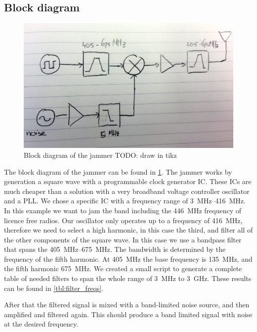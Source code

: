 \documentclass[a4paper, openany, oneside]{memoir}
\begin{document}
\subsection{Block diagram}
\begin{figure}[h]
    \centering
    \includegraphics[width=\textwidth]{block_diagram.jpg}
    \caption{Block diagram of the jammer TODO: draw in tikz}
    \label{fig:block_diagram_jammer}
\end{figure}

The block diagram of the jammer can be found in \cref{fig:block_diagram_jammer}. The jammer works by generation a square wave with a programmable clock generator IC\@. These ICs are much cheaper than a solution with a very broadband voltage controller oscillator and a PLL\@. We chose a specific IC with a frequency range of \SIrange{3}{416}{\mega\hertz}. In this example we want to jam the band including the \SI{446}{\mega\hertz} frequency of licence free radios. Our oscillator only operates up to a frequency of \SI{416}{\mega\hertz}, therefore we need to select a high harmonic, in this case the third, and filter all of the other components of the square wave. In this case we use a bandpass filter that spans the \SIrange{405}{675}{\mega\hertz}. The bandwidth is determined by the frequency of the fifth harmonic. At \SI{405}{\mega\hertz} the base frequency is \SI{135}{\mega\hertz}, and the fifth harmonic \SI{675}{\mega\hertz}. We created a small script to generate a complete table of needed filters to span the whole range of \SI{3}{\mega\hertz} to \SI{3}{\giga\hertz}. These results can be found in \cref{tbl:filter_freqs}.

After that the filtered signal is mixed with a band-limited noise source, and then amplified and filtered again. This should produce a band limited signal with noise at the desired frequency.
\end{document}
